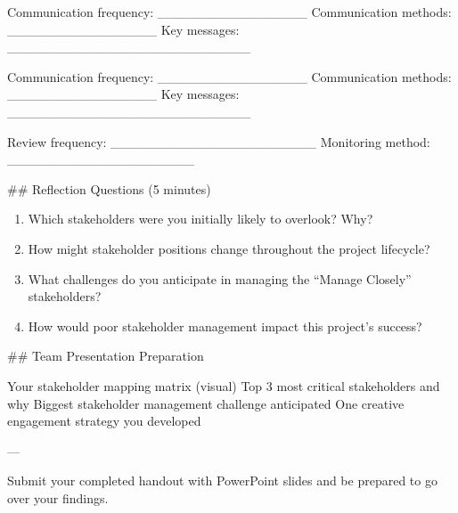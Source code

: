 \documentclass[letterpaper,10pt,english]{sphinxmanual}
\begin{document}
\sphinxAtStartPar
{}
\sphinxhyphen{} Communication frequency: \_\_\_\_\_\_\_\_\_\_\_\_\_\_\_\_
\sphinxhyphen{} Communication methods: \_\_\_\_\_\_\_\_\_\_\_\_\_\_\_\_
\sphinxhyphen{} Key messages: \_\_\_\_\_\_\_\_\_\_\_\_\_\_\_\_\_\_\_\_\_\_\_\_\_\_

\sphinxAtStartPar
{}
\sphinxhyphen{} Communication frequency: \_\_\_\_\_\_\_\_\_\_\_\_\_\_\_\_
\sphinxhyphen{} Communication methods: \_\_\_\_\_\_\_\_\_\_\_\_\_\_\_\_
\sphinxhyphen{} Key messages: \_\_\_\_\_\_\_\_\_\_\_\_\_\_\_\_\_\_\_\_\_\_\_\_\_\_

\sphinxAtStartPar
{}
\sphinxhyphen{} Review frequency: \_\_\_\_\_\_\_\_\_\_\_\_\_\_\_\_\_\_\_\_\_\_
\sphinxhyphen{} Monitoring method: \_\_\_\_\_\_\_\_\_\_\_\_\_\_\_\_\_\_\_\_

\sphinxAtStartPar
\#\# Reflection Questions (5 minutes)
\begin{enumerate}
%
\item {} 
\sphinxAtStartPar
Which stakeholders were you initially likely to overlook? Why?

\item {} 
\sphinxAtStartPar
How might stakeholder positions change throughout the project lifecycle?

\item {} 
\sphinxAtStartPar
What challenges do you anticipate in managing the “Manage Closely” stakeholders?

\item {} 
\sphinxAtStartPar
How would poor stakeholder management impact this project’s success?

\end{enumerate}

\sphinxAtStartPar
\#\# Team Presentation Preparation

\sphinxAtStartPar
{}
\sphinxhyphen{} Your stakeholder mapping matrix (visual)
\sphinxhyphen{} Top 3 most critical stakeholders and why
\sphinxhyphen{} Biggest stakeholder management challenge anticipated
\sphinxhyphen{} One creative engagement strategy you developed

\sphinxAtStartPar
—

\sphinxAtStartPar
{} Submit your completed handout with PowerPoint slides and be prepared to go over your findings.
\end{document}
